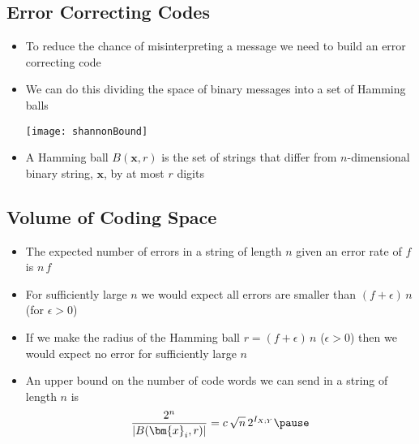 
\begin{slide}
\section[-1]{Error Correcting Codes}
  
\begin{PauseHighLight}
  \begin{itemize}
  \item To reduce the chance of misinterpreting a message we need to
    build an error correcting code\pause
  \item We can do this dividing the space of binary messages into a
    set of Hamming balls
    \begin{center}
       \texttt{[image: shannonBound]}\pause
    \end{center}
  \item A Hamming ball $B(\bm{x}, r)$ is the set of strings that
    differ from $n$-dimensional binary string, $\bm{x}$, by at most
    $r$ digits\pause
  \end{itemize}
\end{PauseHighLight}

\end{slide}


\begin{slide}
\section[-1]{Volume of Coding Space}

\begin{PauseHighLight}
  \begin{itemize}
  \item The expected number of errors in a string of length $n$ given
    an error rate of $f$ is $n\,f$\pause
  \item For sufficiently large $n$ we would expect all errors are
    smaller than $(f+\epsilon)\,n$ (for $\epsilon>0$)\pause
  \item If we make the radius of the Hamming ball $r=(f+\epsilon)\,n$
    ($\epsilon>0$) then we would expect no error for sufficiently large
    $n$\pause
  \item An upper bound on the number of code words we can send in a
    string of length $n$ is
    \begin{align*}
      \frac{2^n}{|B(\bm{x}_i, r)|} = c\,\sqrt{n} \, 2^{I_{X;Y}}\pause
    \end{align*}
  \end{itemize}
\end{PauseHighLight}
\end{slide}

